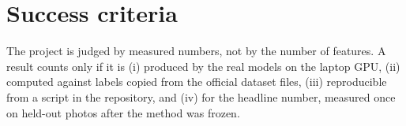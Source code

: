 \section{Success criteria}
The project is judged by measured numbers, not by the number of features. A result counts only if it
is (i) produced by the real models on the laptop GPU, (ii) computed against labels copied from the
official dataset files, (iii) reproducible from a script in the repository, and (iv) for the headline
number, measured once on held-out photos after the method was frozen.

